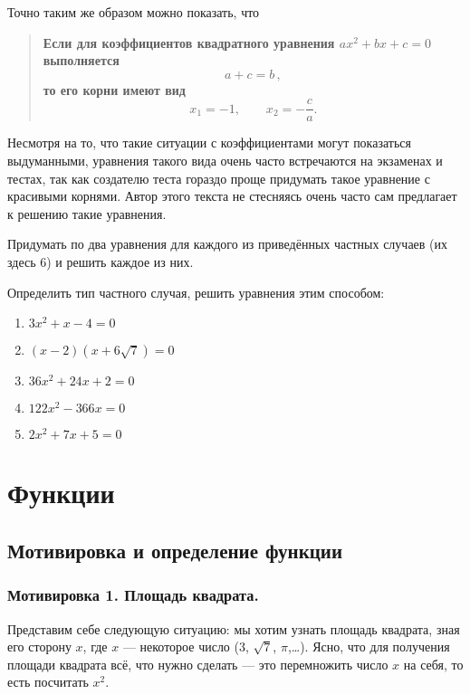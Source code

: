 \documentclass[11pt,fleqn]{book} %
\begin{document}
Точно таким же образом можно показать, что
\begin{quote}
\textbf{Если для коэффициентов квадратного уравнения $ax^2+bx+c = 0$ выполняется $$\boxed{a+c = b}\,,$$ то его корни имеют вид $$x_1 = -1, \qquad x_2 = -\frac{c}{a}.$$}
\end{quote}

\begin{remark}
Несмотря на то, что такие ситуации с коэффициентами могут показаться выдуманными, уравнения такого вида очень часто встречаются на экзаменах и тестах, так как создателю теста гораздо проще придумать такое уравнение с красивыми корнями. Автор этого текста не стесняясь очень часто сам предлагает к решению такие уравнения. 
\end{remark}

\begin{exercise}
Придумать по два уравнения для каждого из приведённых частных случаев (их здесь $6$) и решить каждое из них.
\end{exercise}

\begin{exercise}
Определить тип частного случая, решить уравнения этим способом:
\begin{enumerate}
\item $3x^2 + x - 4 = 0$
\item $(x-2)(x+6\sqrt{7}) = 0$
\item $36x^2 + 24x + 2 = 0$
\item $122x^2 - 366x = 0$
\item $2x^2+7x+5 = 0$
\end{enumerate}
\end{exercise}

\part{Функции}
\chapter{Мотивировка и определение функции}
\section{Мотивировка 1. Площадь квадрата.}
Представим себе следующую ситуацию: мы хотим узнать площадь квадрата, зная его сторону $x$, где $x$ --- некоторое число ($3$, $\sqrt 7$, $\pi$,\ldots). Ясно, что для получения площади квадрата всё, что нужно сделать --- это перемножить число $x$ на себя, то есть посчитать $x^2$.
\end{document}
